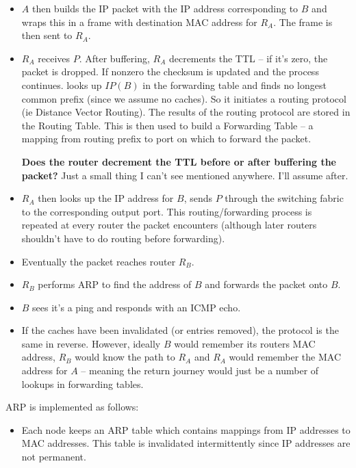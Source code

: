 \documentclass[10pt,\jkfside,a4paper]{article}
\begin{document}
\begin{enumerate}
\begin{itemize}
\item $A$ then builds the IP packet with the IP address corresponding to $B$
and wraps this in a frame with destination MAC address for $R_A$. The frame
is then sent to $R_A$.

\item $R_A$ receives $P$. After buffering, $R_A$ decrements the TTL -- if
it's zero, the packet is dropped. If nonzero the checksum is updated and
the process continues. looks up $IP(B)$ in the forwarding table and finds
no longest common prefix (since we assume no caches). So it initiates a
routing protocol (ie Distance Vector Routing). The results of the routing
protocol are stored in the Routing Table. This is then used to build a
Forwarding Table -- a mapping from routing prefix to port on which to
forward the packet.

\textbf{Does the router decrement the TTL before or after buffering the
packet?} Just a small thing I can't see mentioned anywhere. I'll assume
after.

\item $R_A$ then looks up the IP address for $B$, sends $P$ through the
switching fabric to the corresponding output port. This routing/forwarding
process is repeated at every router the packet encounters (although later
routers shouldn't have to do routing before forwarding).

\item Eventually the packet reaches router $R_B$.

\item $R_B$ performs ARP to find the address of $B$ and forwards the packet
onto $B$.

\item $B$ sees it's a ping and responds with an ICMP echo.

\item If the caches have been invalidated (or entries removed), the protocol
is the same in reverse. However, ideally $B$ would remember its routers MAC
address, $R_B$ would know the path to $R_A$ and $R_A$ would remember the
MAC address for $A$ -- meaning the return journey would just be a number of
lookups in forwarding tables.

\end{itemize}

ARP is implemented as follows:
\begin{itemize}

\item Each node keeps an ARP table which contains mappings from IP
addresses to MAC addresses. This table is invalidated intermittently since
IP addresses are not permanent.


\end{itemize}
\end{enumerate}
\end{document}
